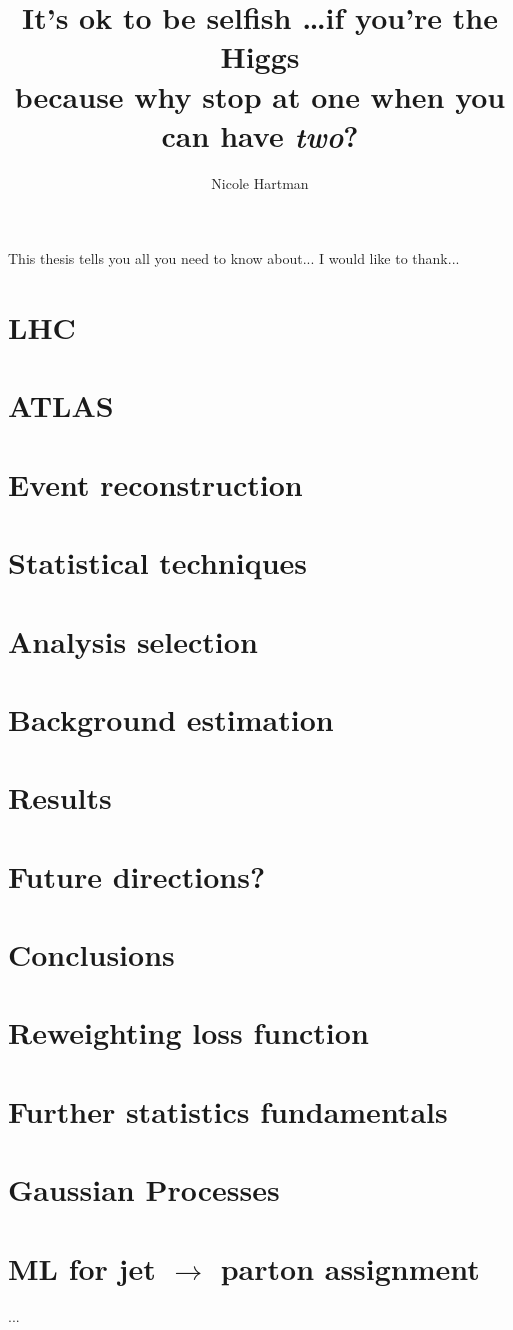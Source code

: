 \documentclass{report}
\begin{document}
\title{It's ok to be selfish \ldots if you're the Higgs\\
       because why stop at one when you can have \emph{two}?}
\author{Nicole Hartman}
 
\beforepreface
{}
This thesis tells you all you need to know about...
I would like to thank...
\afterpreface



\chapter{LHC}
\chapter{ATLAS}
\chapter{Event reconstruction}

\chapter{Statistical techniques}
\chapter{Analysis selection}
\chapter{Background estimation}
\chapter{Results}
\chapter{Future directions?}
\chapter{Conclusions}

\appendix
\chapter{Reweighting loss function}
\chapter{Further statistics fundamentals}
\chapter{Gaussian Processes}
\chapter{ML for jet $\rightarrow$ parton assignment}


...


\end{document}
